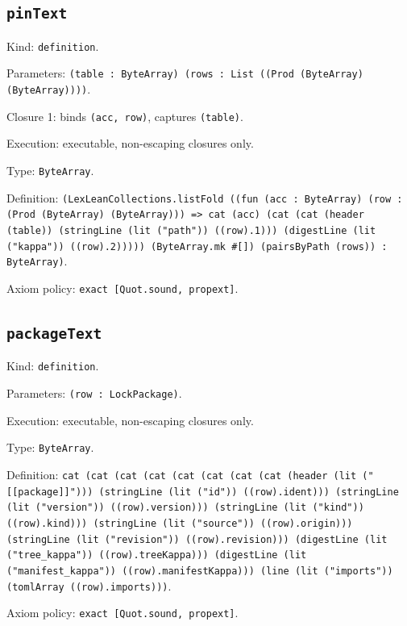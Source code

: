\documentclass[11pt]{article}
\begin{document}
\subsection*{\texttt{pinText}}
\noindent Kind: \texttt{definition}.\par
\noindent Parameters: \texttt{(table : ByteArray) (rows : List ((Prod (ByteArray) (ByteArray))))}.\par
\noindent Closure 1: binds \texttt{(acc, row)}, captures \texttt{(table)}.\par
\noindent Execution: executable, non-escaping closures only.\par
\noindent Type: \texttt{ByteArray}.\par
\noindent Definition: \texttt{(LexLeanCollections.listFold ((fun (acc : ByteArray) (row : (Prod (ByteArray) (ByteArray))) => cat (acc) (cat (cat (header (table)) (stringLine (lit ("path")) ((row).1))) (digestLine (lit ("kappa")) ((row).2))))) (ByteArray.mk \#[]) (pairsByPath (rows)) : ByteArray)}.\par
\noindent Axiom policy: \texttt{exact [Quot.sound, propext]}.\par
\subsection*{\texttt{packageText}}
\noindent Kind: \texttt{definition}.\par
\noindent Parameters: \texttt{(row : LockPackage)}.\par
\noindent Execution: executable, non-escaping closures only.\par
\noindent Type: \texttt{ByteArray}.\par
\noindent Definition: \texttt{cat (cat (cat (cat (cat (cat (cat (cat (header (lit ("[[package]]"))) (stringLine (lit ("id")) ((row).ident))) (stringLine (lit ("version")) ((row).version))) (stringLine (lit ("kind")) ((row).kind))) (stringLine (lit ("source")) ((row).origin))) (stringLine (lit ("revision")) ((row).revision))) (digestLine (lit ("tree\_kappa")) ((row).treeKappa))) (digestLine (lit ("manifest\_kappa")) ((row).manifestKappa))) (line (lit ("imports")) (tomlArray ((row).imports)))}.\par
\noindent Axiom policy: \texttt{exact [Quot.sound, propext]}.\par
\end{document}
